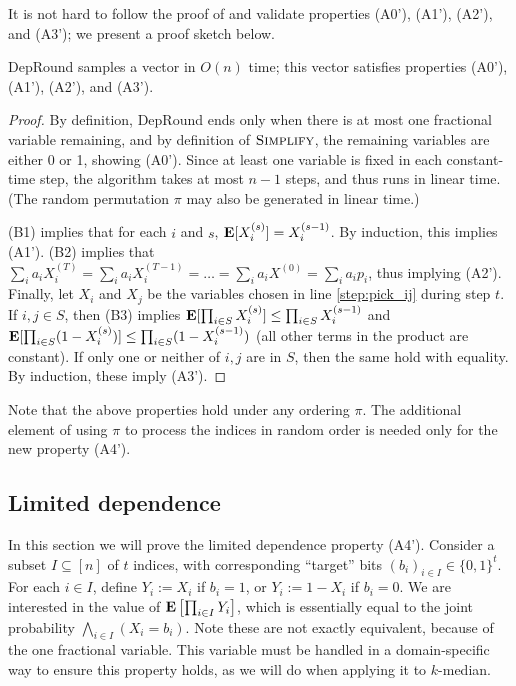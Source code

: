 It is not hard to follow the proof of \cite{srin:level-sets} and validate properties (A0'), (A1'), (A2'), and (A3'); we present a proof sketch below. 
\begin{lemma}
{\sc DepRound} samples a vector in $O(n)$ time; this vector satisfies properties (A0'), (A1'), (A2'), and (A3').
\end{lemma}
\begin{proof}
By definition, {\sc DepRound} ends only when there is at most one fractional variable remaining, and by definition of $\textsc{Simplify}$, the remaining variables are either 0 or 1, showing (A0'). Since at least one variable is fixed in each constant-time step, the algorithm takes at most $n-1$ steps, and thus runs in linear time. (The random permutation $\pi$ may also be generated in linear time.)

(B1) implies that for each $i$ and $s$, $\text{\bf E}[X_i^{(s)}]=X_i^{(s-1)}$. By induction, this implies (A1'). (B2) implies that $\sum_i a_i X^{(T)}_i =\sum_i a_i X^{(T-1)}_i =\ldots=\sum_i a_i X^{(0)}=\sum_i a_i p_i$, thus implying (A2'). Finally, let $X_i$ and $X_j$ be the variables chosen in line \ref{step:pick_ij} during step $t$. If $i,j\in S$, then (B3) implies $\text{\bf E}[\prod_{i\in S}X^{(s)}_i]\le \prod_{i\in S}X^{(s-1)}_i$ and $\text{\bf E}[\prod_{i\in S}(1-X^{(s)}_i)]\le\prod_{i\in S}(1-X^{(s-1)}_i)$ (all other terms in the product are constant). If only one or neither of $i,j$ are in $S$, then the same hold with equality. By induction, these imply (A3').
\end{proof}
Note that the above properties hold under any ordering $\pi$. The additional element of using $\pi$ to process the indices in random order is needed only for the new property (A4').

\subsection{Limited dependence} 
In this section we will prove the limited dependence property (A4').  Consider a subset $I\subseteq[n]$ of $t$ indices, with corresponding ``target'' bits $(b_i)_{i\in I}\in\{0,1\}^t$.  For each $i\in I$, define $Y_i:=X_i$ if $b_i=1$, or $Y_i:=1-X_i$ if $b_i=0$. We are interested in the value of $\text{\bf E}\left[\prod_{i\in I}Y_i\right]$, which is essentially equal to the joint probability $\bigwedge_{i\in I}(X_i=b_i)$. Note these are not exactly equivalent, because of the one fractional variable. This variable must be handled in a domain-specific way to ensure this property holds, as we will do when applying it to $k$-median.

